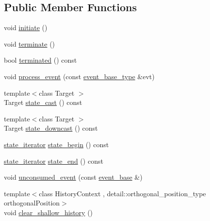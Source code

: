 \subsection*{Public Member Functions}
\begin{DoxyCompactItemize}
\item 
void \mbox{\hyperlink{classboost_1_1statechart_1_1state__machine_a7165ce3d1120b98dde6e8d669e35aba9}{initiate}} ()
\item 
void \mbox{\hyperlink{classboost_1_1statechart_1_1state__machine_a6abd7c38c09f87fa662c5aa5e8f6f3ff}{terminate}} ()
\item 
bool \mbox{\hyperlink{classboost_1_1statechart_1_1state__machine_a78fc6d94ce7ba0ac18e0a83e96f3b215}{terminated}} () const
\item 
void \mbox{\hyperlink{classboost_1_1statechart_1_1state__machine_a78598d4982f6b85e83358652eb1c3d6e}{process\+\_\+event}} (const \mbox{\hyperlink{classboost_1_1statechart_1_1state__machine_adb0e98d6d780a0977209fa7389b20bcd}{event\+\_\+base\+\_\+type}} \&evt)
\item 
{\footnotesize template$<$class Target $>$ }\\Target \mbox{\hyperlink{classboost_1_1statechart_1_1state__machine_aabd07005b47036311b5e80e05c1746c2}{state\+\_\+cast}} () const
\item 
{\footnotesize template$<$class Target $>$ }\\Target \mbox{\hyperlink{classboost_1_1statechart_1_1state__machine_a8054170cced8b908272d9d8ba9e5deb9}{state\+\_\+downcast}} () const
\item 
\mbox{\hyperlink{classboost_1_1statechart_1_1state__machine_1_1state__iterator}{state\+\_\+iterator}} \mbox{\hyperlink{classboost_1_1statechart_1_1state__machine_a270c21248c558be7daf8139c032b1f0c}{state\+\_\+begin}} () const
\item 
\mbox{\hyperlink{classboost_1_1statechart_1_1state__machine_1_1state__iterator}{state\+\_\+iterator}} \mbox{\hyperlink{classboost_1_1statechart_1_1state__machine_aab9cfe96af77fbfb10098f9c6ba209a5}{state\+\_\+end}} () const
\item 
void \mbox{\hyperlink{classboost_1_1statechart_1_1state__machine_ac9ec2b1cfa39a11852cf1b90e4a2aa12}{unconsumed\+\_\+event}} (const \mbox{\hyperlink{classboost_1_1statechart_1_1event__base}{event\+\_\+base}} \&)
\item 
{\footnotesize template$<$class History\+Context , detail\+::orthogonal\+\_\+position\+\_\+type orthogonal\+Position$>$ }\\void \mbox{\hyperlink{classboost_1_1statechart_1_1state__machine_a03faf369327ddc16441c8e69db08e861}{clear\+\_\+shallow\+\_\+history}} ()

\end{DoxyCompactItemize}

